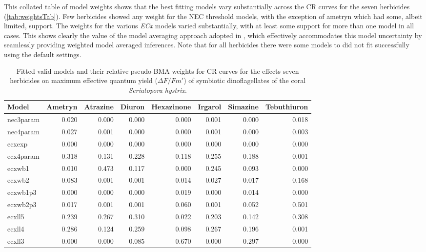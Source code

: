 \documentclass[
  shortnames]{jss}
\begin{document}
This collated table of model weights shows that the best fitting models vary substantially across the CR curves for the seven herbicides (\autoref{tab:weightsTab}). Few herbicides showed any weight for the NEC threshold models, with the exception of ametryn which had some, albeit limited, support. The weights for the various \emph{ECx} models varied substantially, with at least some support for more than one model in all cases. This shows clearly the value of the model averaging approach adopted in , which effectively accommodates this model uncertainty by seamlessly providing weighted model averaged inferences. Note that for all herbicides there were some models to did not fit successfully using the default  settings.

\begin{CodeChunk}
\begin{table}

\caption{\label{tab:weightsTab}Fitted valid models and their relative pseudo-BMA weights for CR curves for the effects seven herbicides on maximum effective quantum yield ($\Delta F / Fm'$) of symbiotic dinoflagellates of the coral \textit{Seriatopora hystrix}.}
\centering
\begin{tabular}[t]{l|r|r|r|r|r|r|r}
\hline
Model & Ametryn & Atrazine & Diuron & Hexazinone & Irgarol & Simazine & Tebuthiuron\\
\hline
nec3param & 0.020 & 0.000 & 0.000 & 0.000 & 0.001 & 0.000 & 0.018\\
\hline
nec4param & 0.027 & 0.001 & 0.000 & 0.000 & 0.001 & 0.000 & 0.003\\
\hline
ecxexp & 0.000 & 0.000 & 0.000 & 0.000 & 0.000 & 0.000 & 0.000\\
\hline
ecx4param & 0.318 & 0.131 & 0.228 & 0.118 & 0.255 & 0.188 & 0.001\\
\hline
ecxwb1 & 0.010 & 0.473 & 0.117 & 0.000 & 0.245 & 0.093 & 0.000\\
\hline
ecxwb2 & 0.083 & 0.001 & 0.001 & 0.014 & 0.027 & 0.017 & 0.168\\
\hline
ecxwb1p3 & 0.000 & 0.000 & 0.000 & 0.019 & 0.000 & 0.014 & 0.000\\
\hline
ecxwb2p3 & 0.017 & 0.001 & 0.001 & 0.060 & 0.001 & 0.052 & 0.501\\
\hline
ecxll5 & 0.239 & 0.267 & 0.310 & 0.022 & 0.203 & 0.142 & 0.308\\
\hline
ecxll4 & 0.286 & 0.124 & 0.259 & 0.098 & 0.267 & 0.196 & 0.001\\
\hline
ecxll3 & 0.000 & 0.000 & 0.085 & 0.670 & 0.000 & 0.297 & 0.000\\
\hline
\end{tabular}
\end{table}

\end{CodeChunk}
\end{document}
